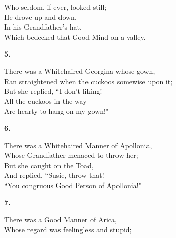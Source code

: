\documentclass{book}
\begin{document}
{\hspace*{14mm}       Who seldom, if ever, looked still; \\
\hspace*{14mm}       He drove up and down, \\
\hspace*{14mm}       In his Grandfather's hat, \\
\hspace*{14mm}       Which bedecked that Good Mind on a valley.
\begin{center}
\textbf{    5.}
\end{center}
\par
\noindent
\hspace*{14mm}       There was a Whitehaired Georgina whose gown, \\
\hspace*{14mm}       Ran straightened when the cuckoos somewise upon it; \\
\hspace*{14mm}       But she replied, ``\textsc{I} don't liking! \\
\hspace*{14mm}       All the cuckoos in the way \\
\hspace*{14mm}       Are hearty to hang on my gown!"
\begin{center}
\textbf{    6.}
\end{center}
\par
\noindent
\hspace*{14mm}       There was a Whitehaired Manner of Apollonia, \\
\hspace*{14mm}       Whose Grandfather menaced to throw her; \\
\hspace*{14mm}       But she caught on the Toad, \\
\hspace*{14mm}       And replied, ``Susie, throw that! \\
\hspace*{14mm}       ``You congruous Good Person of Apollonia!"
\begin{center}
\textbf{    7.}
\end{center}
\par
\noindent
\hspace*{14mm}       There was a Good Manner of Arica, \\
\hspace*{14mm}       Whose regard was feelingless and stupid; \\
}
\end{document}
